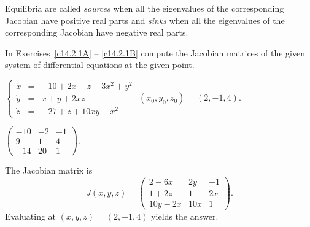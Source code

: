 \documentclass{ximera}
\begin{document}
Equilibria are called {\em sources\/} when all the eigenvalues 
of the corresponding Jacobian have positive real parts and 
{\em sinks\/} when all the eigenvalues of the corresponding 
Jacobian have negative real parts.



\EXER

\TEXER  

\noindent In Exercises~\ref{c14.2.1A} -- \ref{c14.2.1B} compute the Jacobian 
matrices of the given system of differential equations at the given point.
\begin{exercise} \label{c14.2.1A}
$\left\{\begin{array}{rcl} 
\dot{x} & = & -10 + 2x - z - 3x^2+y^2 \\
\dot{y} & = & x + y + 2xz \\
\dot{z} & = & -27 + z + 10xy - x^2  \end{array}\right.$ 
\AND $(x_0,y_0,z_0) = (2,-1,4)$.

\begin{solution}
\ans $\left(\begin{array}{rrr}
-10 & -2 & -1\\ 9 & 1 & 4 \\ -14 & 20 & 1\end{array}\right)$.

\vspace{0.08in}

\soln  The Jacobian matrix is
\[
J(x,y,z) = \left(\begin{array}{ccc}
2 - 6x & 2y & -1\\ 1+2z & 1 & 2x\\ 10y-2x & 10x & 1\end{array}\right).
\]
Evaluating at $(x,y,z)=(2,-1,4)$ yields the answer.

\end{solution}
\end{exercise}
\end{document}
